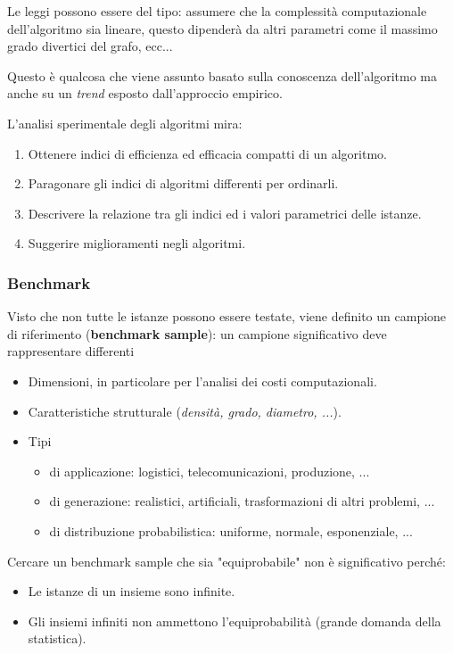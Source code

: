 \documentclass{article}
\begin{document}
Le leggi possono essere del tipo: assumere che la complessità computazionale
dell'algoritmo sia lineare, questo dipenderà da altri parametri come il massimo
grado divertici del grafo, ecc...

Questo è qualcosa che viene assunto basato sulla conoscenza dell'algoritmo ma anche su
un \textit{trend} esposto dall'approccio empirico.

L'analisi sperimentale degli algoritmi mira:
\begin{enumerate}
    \item Ottenere indici di efficienza ed efficacia compatti di un algoritmo.
    \item Paragonare gli indici di algoritmi differenti per ordinarli.
    \item Descrivere la relazione tra gli indici ed i valori parametrici delle istanze.
    \item Suggerire miglioramenti negli algoritmi.
\end{enumerate}

\subsubsection{Benchmark}
Visto che non tutte le istanze possono essere testate, viene definito un campione di
riferimento (\textbf{benchmark sample}): un campione significativo deve rappresentare differenti
\begin{itemize}
    \item Dimensioni, in particolare per l'analisi dei costi computazionali.
    \item Caratteristiche strutturale (\textit{densità, grado, diametro, ...}).
    \item Tipi
          \begin{itemize}
              \item di applicazione: logistici, telecomunicazioni, produzione, ...
              \item di generazione: realistici, artificiali, trasformazioni di altri problemi, ...
              \item di distribuzione probabilistica: uniforme, normale, esponenziale, ...
          \end{itemize}
\end{itemize}
Cercare un benchmark sample che sia "equiprobabile" non è significativo perché:
\begin{itemize}
    \item Le istanze di un insieme sono infinite.
    \item Gli insiemi infiniti non ammettono l'equiprobabilità (grande domanda della statistica).
\end{itemize}
\end{document}
